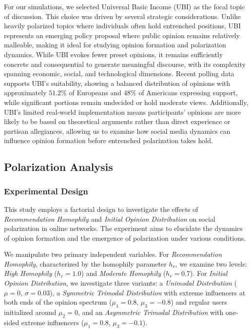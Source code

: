 For our simulations, we selected Universal Basic Income (UBI) as the focal topic of discussion. This choice was driven by several strategic considerations. Unlike heavily polarized topics where individuals often hold entrenched positions, UBI represents an emerging policy proposal where public opinion remains relatively malleable, making it ideal for studying opinion formation and polarization dynamics. While UBI evokes fewer preset opinions, it remains sufficiently concrete and consequential to generate meaningful discourse, with its complexity spanning economic, social, and technological dimensions. Recent polling data supports UBI's suitability, showing a balanced distribution of opinions with approximately $51.2\%$ of Europeans \citep{vlandas_politics_2019} and $48\%$ of Americans \citep{hamilton_people_2022} expressing support, while significant portions remain undecided or hold moderate views. Additionally, UBI's limited real-world implementation means participants' opinions are more likely to be based on theoretical arguments rather than direct experience or partisan allegiances, allowing us to examine how social media dynamics can influence opinion formation before entrenched polarization takes hold.

\subsection{Polarization Analysis}

\subsubsection{Experimental Design}

This study employs a factorial design to investigate the effects of \emph{Recommendation Homophily} and \emph{Initial Opinion Distribution} on social polarization in online networks. The experiment aims to elucidate the dynamics of opinion formation and the emergence of polarization under various conditions.

We manipulate two primary independent variables. For \emph{Recommendation Homophily}, characterized by the homophily parameter $h_r$, we examine two levels: \emph{High Homophily} ($h_r = 1.0$) and \emph{Moderate Homophily} ($h_r = 0.7$). For \emph{Initial Opinion Distribution}, we investigate three variants: a \emph{Unimodal Distribution} ($\mu = 0$, $\sigma = 0.03$), a \emph{Symmetric Trimodal Distribution} with extreme influencers at both ends of the opinion spectrum ($\mu_1 = 0.8$, $\mu_3 = -0.8$) and regular users initialized around $\mu_2 = 0$, and an \emph{Asymmetric Trimodal Distribution} with one-sided extreme influencers ($\mu_1 = 0.8$, $\mu_3 = -0.1$).

